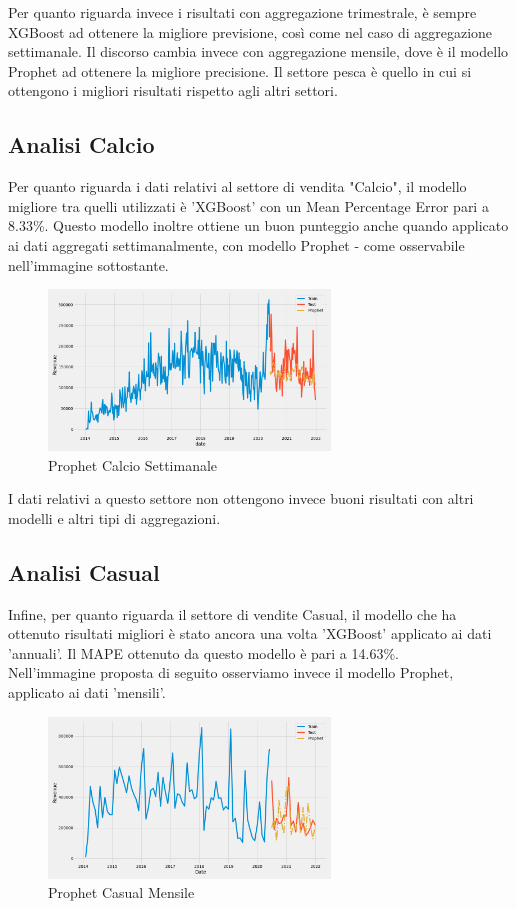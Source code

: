 \documentclass[12pt, a4paper, twocolumn]{article} %
\begin{document}
Per quanto riguarda invece i risultati con aggregazione trimestrale, è sempre XGBoost ad ottenere la migliore previsione, così come nel caso di aggregazione settimanale. Il discorso cambia invece con aggregazione mensile, dove è il modello Prophet ad ottenere la migliore precisione. Il settore pesca è quello in cui si ottengono i migliori risultati rispetto agli altri settori.

\subsection{Analisi Calcio}
Per quanto riguarda i dati relativi al settore di vendita "Calcio", il modello migliore tra quelli utilizzati è 'XGBoost' con un Mean Percentage Error pari a 8.33\%. Questo modello inoltre ottiene un buon punteggio anche quando applicato ai dati aggregati settimanalmente, con modello Prophet - come osservabile nell'immagine sottostante.
\begin{figure}[H]
  \caption{Prophet Calcio Settimanale}
  \begin{center}
    \includegraphics[width=75mm,scale=0.5]{Calcio_settimanale_19.07}
  \end{center}
\end{figure}

I dati relativi a questo settore non ottengono invece buoni risultati con altri modelli e altri tipi di aggregazioni.

\subsection{Analisi Casual}
Infine, per quanto riguarda il settore di vendite Casual, il modello che ha ottenuto risultati migliori è stato ancora una volta 'XGBoost' applicato ai dati 'annuali'. Il MAPE ottenuto da questo modello è pari a 14.63\%.\\
Nell'immagine proposta di seguito osserviamo invece il modello Prophet, applicato ai dati 'mensili'.
\begin{figure}[H]
  \caption{Prophet Casual Mensile}
  \begin{center}
    \includegraphics[width=75mm,scale=0.5]{Casual_mensile_22.88}
  \end{center}
\end{figure}
\end{document}
